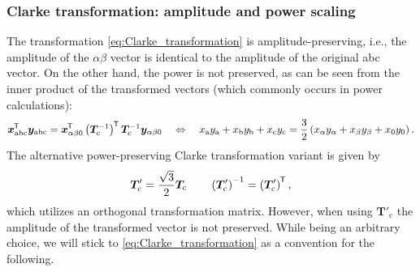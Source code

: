 \begin{frame}
	\frametitle{Clarke transformation: amplitude and power scaling}
	The transformation \eqref{eq:Clarke_transformation} is amplitude-preserving, i.e., the amplitude of the $\alpha\beta$ vector is identical to the amplitude of the original abc vector. \pause On the other hand, the power is not preserved, as can be seen from the inner product of the transformed vectors (which commonly occurs in power calculations):
	\begin{equation*}
		\bm{x}_{\mathrm{abc}}^{\mkern-1.5mu\mathsf{T}} \bm{y}_{\mathrm{abc}} = \bm{x}_\mathrm{\alpha \beta 0}^{\mkern-1.5mu\mathsf{T}}\left(\bm{T}_\mathrm{c}^{-1}\right)^{\mkern-1.5mu\mathsf{T}} \bm{T}_\mathrm{c}^{-1}\bm{y}_\mathrm{\alpha \beta 0} \quad \Leftrightarrow \quad x_\mathrm{a}y_\mathrm{a} + x_\mathrm{b}y_\mathrm{b} + x_\mathrm{c}y_\mathrm{c} = \frac{3}{2}\left(x_\alpha y_\alpha + x_\beta y_\beta + x_0 y_0 \right).
	\end{equation*}
	\pause
	The alternative power-preserving Clarke transformation variant is given by
	\begin{equation}
		\renewcommand{\arraystretch}{1.2}
		\bm{T}'_\mathrm{c} = \frac{\sqrt{3}}{2} \bm{T}_\mathrm{c} \qquad \left(\bm{T}'_\mathrm{c}\right)^{-1} = \left(\bm{T}'_\mathrm{c}\right)\T,
		\label{eq:Clarke_transformation_power_preserving}
	\end{equation}
	which utilizes an orthogonal transformation matrix. \pause However, when using $\bm{T}'_\mathrm{c}$ the amplitude of the transformed vector is not preserved. While being an arbitrary choice, we will stick to \eqref{eq:Clarke_transformation} as a convention for the following.
\end{frame}

